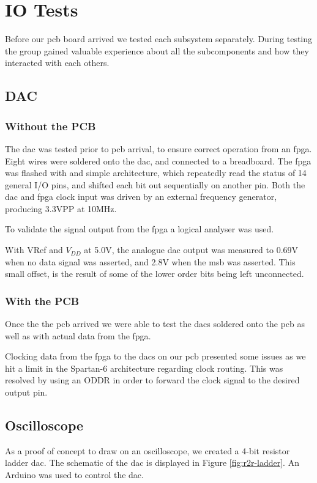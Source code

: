 \section{IO Tests}
Before our \gls{pcb} board arrived we tested each subsystem separately.
During testing the group gained valuable experience about all the subcomponents and how they interacted with each others.

\subsection{DAC}

\subsubsection{Without the PCB}

The \gls{dac} was tested prior to \gls{pcb} arrival, to ensure correct operation from an \gls{fpga}.
Eight wires were soldered onto the \gls{dac}, and connected to a breadboard.
The \gls{fpga} was flashed with and simple architecture, which repeatedly read the status of 14 general I/O pins, and shifted each bit out sequentially on another pin.
Both the \gls{dac} and \gls{fpga} clock input was driven by an external frequency generator, producing 3.3VPP at 10MHz.

To validate the signal output from the \gls{fpga} a logical analyser was used.

With VRef and \(V_{DD}\) at 5.0V, the analogue \gls{dac} output was measured to 0.69V when no data signal was asserted, and 2.8V when the \gls{msb} was asserted. This small offset, is the result of some of the lower order bits being left unconnected.

\subsubsection{With the PCB}

Once the the \gls{pcb} arrived we were able to test the \gls{dac}s soldered onto the \gls{pcb} as well as with actual data from the \gls{fpga}.

Clocking data from the \gls{fpga} to the \gls{dac}s on our \gls{pcb} presented some issues as we hit a limit in the Spartan-6 architecture regarding clock routing. This was resolved by using an ODDR\cite[pp. 61--65]{fpga-io} in order to forward the clock signal to the desired output pin.


\subsection{Oscilloscope}
As a proof of concept to draw on an oscilloscope, we created a 4-bit resistor ladder \gls{dac}. The schematic of the \gls{dac} is displayed in Figure \ref{fig:r2r-ladder}.
An Arduino was used to control the \gls{dac}.

